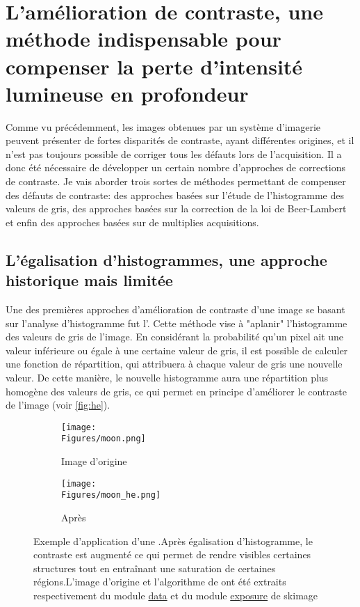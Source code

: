 \documentclass[\main/main.tex]{subfiles}
\begin{document}
            
\section{L'amélioration de contraste, une méthode indispensable pour compenser la perte d'intensité lumineuse en profondeur}

%
Comme vu précédemment, les images obtenues par un système d'imagerie peuvent présenter de fortes disparités de contraste, ayant différentes origines, et il n'est pas toujours possible de corriger tous les défauts lors de l'acquisition.
%
Il a donc été nécessaire de développer un certain nombre d'approches de corrections de contraste.
%
Je vais aborder trois sortes de méthodes permettant de compenser des défauts de contraste: des approches basées sur l'étude de l'histogramme des valeurs de gris, des approches basées sur la correction de la loi de Beer-Lambert et enfin des approches basées sur de multiplies acquisitions.

\subsection{L'égalisation d'histogrammes, une approche historique mais limitée}

%
Une des premières approches d'amélioration de contraste d'une image se basant sur l'analyse d'histogramme fut l'\he{}.
%
Cette méthode vise à "aplanir" l'histogramme des valeurs de gris de l'image.
%
En considérant la probabilité qu'un pixel ait une valeur inférieure ou égale à une certaine valeur de gris,
il est possible de calculer une fonction de répartition, qui attribuera à chaque valeur de gris une nouvelle valeur. De cette manière, le nouvelle histogramme aura une répartition plus homogène des valeurs de gris, ce qui permet en principe d'améliorer le contraste de l'image (voir \autoref{fig:he}).

\begin{figure}[h!]
    \centering
    \begin{subfigure}[b]{0.45\textwidth}
       \caption{
       Image d'origine
            }
       \centering \texttt{[image: \\Figures/moon.png]}
    \end{subfigure}
    \begin{subfigure}[b]{0.45\textwidth}
       \caption{
       Après \he{}
            }
       \centering \texttt{[image: \\Figures/moon\_he.png]}
    \end{subfigure}
    \caption{
        \label{fig:he}
        Exemple d'application d'une \he{}.\newline Après égalisation d'histogramme, le contraste est augmenté ce qui permet de rendre visibles certaines structures tout en entraînant une saturation de certaines régions.L'image d'origine et l'algorithme de \he{} ont été extraits respectivement du module \href{https://scikit-image.org/docs/dev/api/skimage.data.html#skimage.data.moon}{data} et du module \href{https://scikit-image.org/docs/dev/api/skimage.exposure.html}{exposure} de skimage}
\end{figure}
\end{document}
